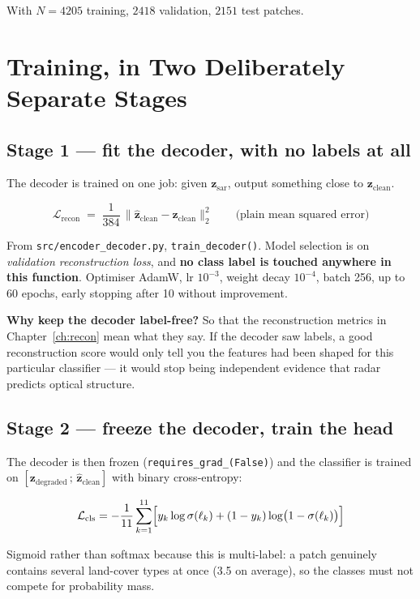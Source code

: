\documentclass[11pt,a4paper]{report}
\newcommand{\file}[1]{\texttt{\small #1}}
\newcommand{\code}[1]{\texttt{\small #1}}
\newcommand{\zc}{\mathbf{z}_{\text{clean}}}
\newcommand{\zd}{\mathbf{z}_{\text{degraded}}}
\newcommand{\zs}{\mathbf{z}_{\text{sar}}}
\newcommand{\zh}{\hat{\mathbf{z}}_{\text{clean}}}
\begin{document}
With $N = 4205$ training, $2418$ validation, $2151$ test patches.

\chapter{Training, in Two Deliberately Separate Stages}
\label{ch:train}

\section{Stage 1 --- fit the decoder, with no labels at all}

The decoder is trained on one job: given $\zs$, output something close to $\zc$.

\[
\mathcal{L}_{\text{recon}} \;=\; \frac{1}{384}\,
\bigl\lVert \zh - \zc \bigr\rVert_2^2
\qquad\text{(plain mean squared error)}
\]

\begin{codedoes}
From \file{src/encoder\_decoder.py}, \code{train\_decoder()}. Model selection is
on \emph{validation reconstruction loss}, and \textbf{no class label is
touched anywhere in this function}. Optimiser AdamW, lr $10^{-3}$, weight decay
$10^{-4}$, batch 256, up to 60 epochs, early stopping after 10 without
improvement.
\end{codedoes}

\begin{whybox}
\textbf{Why keep the decoder label-free?} So that the reconstruction metrics in
Chapter~\ref{ch:recon} mean what they say. If the decoder saw labels, a good
reconstruction score would only tell you the features had been shaped for this
particular classifier --- it would stop being independent evidence that radar
predicts optical structure.
\end{whybox}

\section{Stage 2 --- freeze the decoder, train the head}

The decoder is then frozen (\code{requires\_grad\_(False)}) and the classifier
is trained on $[\zd\,;\,\zh]$ with binary cross-entropy:

\[
\mathcal{L}_{\text{cls}} = -\frac{1}{11}\sum_{k=1}^{11}
\Bigl[ y_k \log \sigma(\ell_k) + (1-y_k)\log\bigl(1-\sigma(\ell_k)\bigr) \Bigr]
\]

Sigmoid rather than softmax because this is multi-label: a patch genuinely
contains several land-cover types at once (3.5 on average), so the classes must
not compete for probability mass.
\end{document}
